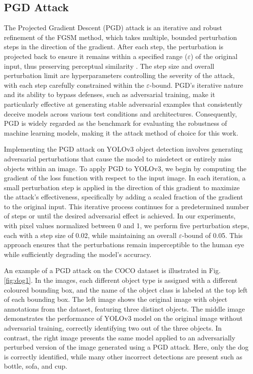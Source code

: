 \documentclass[journal,onecolumn,12pt]{IEEEtran}
\begin{document}
\subsection{PGD Attack}
The Projected Gradient Descent (PGD) attack is an iterative and robust refinement of the FGSM method, which takes multiple, bounded perturbation steps in the direction of the gradient. After each step, the perturbation is projected back to ensure it remains within a specified range ($\varepsilon$) of the original input, thus preserving perceptual similarity \cite{madry2019deeplearningmodelsresistant}. The step size and overall perturbation limit are hyperparameters controlling the severity of the attack, with each step carefully constrained within the $\varepsilon$-bound. PGD’s iterative nature and its ability to bypass defenses, such as adversarial training, make it particularly effective at generating stable adversarial examples that consistently deceive models across various test conditions and architectures. Consequently, PGD is widely regarded as the benchmark for evaluating the robustness of machine learning models, making it the attack method of choice for this work.

Implementing the PGD attack on YOLOv3 object detection involves generating adversarial perturbations that cause the model to misdetect or entirely miss objects within an image. To apply PGD to YOLOv3, we begin by computing the gradient of the loss function with respect to the input image. In each iteration, a small perturbation step is applied in the direction of this gradient to maximize the attack's effectiveness, specifically by adding a scaled fraction of the gradient to the original input. This iterative process continues for a predetermined number of steps or until the desired adversarial effect is achieved. In our experiments, with pixel values normalized between 0 and 1, we perform five perturbation steps, each with a step size of 0.02, while maintaining an overall $\varepsilon$-bound of 0.05. This approach ensures that the perturbations remain imperceptible to the human eye while sufficiently degrading the model's accuracy. 

An example of a PGD attack on the COCO dataset is illustrated in Fig. \ref{fig:dog1}. In the images, each different object type is assigned with a different coloured bounding box, and the name of the object class is labeled at the top left of each bounding box. The left image shows the original image with object annotations from the dataset, featuring three distinct objects. The middle image demonstrates the performance of YOLOv3 model on the original image without adversarial training, correctly identifying two out of the three objects. In contrast, the right image presents the same model applied to an adversarially perturbed version of the image generated using a PGD attack. Here, only the dog is correctly identified, while many other incorrect detections are present such as bottle, sofa, and cup. 
\end{document}
